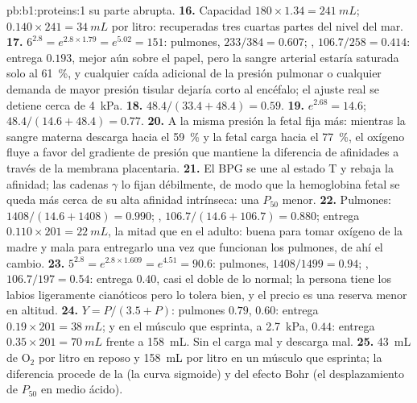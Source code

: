 \begin{solution}{pb:b1:proteins:1}
su parte abrupta.
\textbf{16.} Capacidad $180\times 1.34 = \qty{241}{mL}$; $0.140\times
241 = \qty{34}{mL}$ por litro: recuperadas tres cuartas partes del nivel del
mar.
\textbf{17.} $6^{2.8} = e^{2.8\times 1.79} = e^{5.02} = 151$: pulmones,
$233/384 = 0.607$; , $106.7/258 = 0.414$: entrega $0.193$, mejor aún
sobre el papel, pero la sangre arterial estaría saturada solo al
\qty{61}{\%}, y cualquier caída adicional de la presión pulmonar o cualquier
demanda de mayor presión tisular dejaría corto al encéfalo; el ajuste real
se detiene cerca de \qty{4}{kPa}.
\textbf{18.} $48.4/(33.4 + 48.4) = 0.59$.
\textbf{19.} $e^{2.68} = 14.6$; $48.4/(14.6 + 48.4) = 0.77$.
\textbf{20.} A la misma presión la  fetal fija más: mientras la
sangre materna descarga hacia el \qty{59}{\%} y la fetal carga hacia el
\qty{77}{\%}, el oxígeno fluye a favor del gradiente de presión que mantiene
la diferencia de afinidades a través de la membrana placentaria.
\textbf{21.} El BPG se une al estado T y rebaja la afinidad; las cadenas
$\gamma$ lo fijan débilmente, de modo que la hemoglobina fetal se queda más
cerca de su alta afinidad intrínseca: una $P_{50}$ menor.
\textbf{22.} Pulmones: $1408/(14.6 + 1408) = 0.990$; , $106.7/(14.6
+ 106.7) = 0.880$; entrega $0.110\times 201 = \qty{22}{mL}$, la mitad que en
el adulto: buena para tomar oxígeno de la madre y mala para entregarlo una
vez que funcionan los pulmones, de ahí el cambio.
\textbf{23.} $5^{2.8} = e^{2.8\times 1.609} = e^{4.51} = 90.6$: pulmones,
$1408/1499 = 0.94$; , $106.7/197 = 0.54$: entrega $0.40$, casi el
doble de lo normal; la persona tiene los labios ligeramente cianóticos pero
lo tolera bien, y el precio es una reserva menor en altitud.
\textbf{24.} $Y = P/(3.5 + P)$: pulmones $0.79$,  $0.60$: entrega
$0.19\times 201 = \qty{38}{mL}$; y en el músculo que esprinta, a
\qty{2.7}{kPa}, $0.44$: entrega $0.35\times 201 = \qty{70}{mL}$ frente a
\qty{158}{mL}. Sin  el  carga mal y descarga
mal.
\textbf{25.} \qty{43}{mL} de $\mathrm{O_2}$ por litro en reposo y
\qty{158}{mL} por litro en un músculo que esprinta; la diferencia procede de
la  (la curva sigmoide) y del efecto Bohr (el desplazamiento
de $P_{50}$ en medio ácido).
\end{solution}
